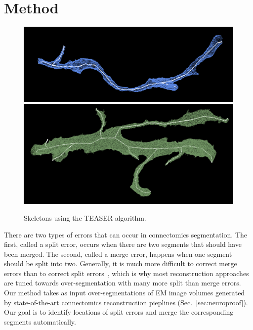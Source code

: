 \section{Method}

\begin{figure}[t]
	\centering
	\includegraphics[width=0.92\linewidth]{./figures/skeleton1.png}
	\includegraphics[width=0.92\linewidth]{./figures/skeleton2.png}
	\caption{Skeletons using the TEASER algorithm.}
	\label{fig:skeletonization}
\end{figure}

There are two types of errors that can occur in connectomics segmentation.
The first, called a split error, occurs when there are two segments that should have been merged. The second, called a merge error, happens when one segment should be split into two. Generally, it is much more difficult to correct merge errors than to correct split errors~\cite{parag2015properties}, which is why most reconstruction approaches are tuned towards over-segmentation with many more split than merge errors. Our method takes as input over-segmentations of EM image volumes generated by state-of-the-art connectomics reconstruction pieplines (Sec.~\ref{sec:neuroproof}). Our goal is to identify locations of split errors and merge the corresponding segments automatically.

